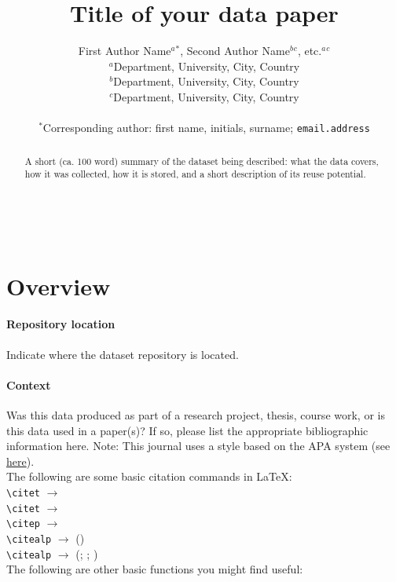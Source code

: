 \documentclass{article}
\title{Title of your data paper}
\author{First Author Name$^{a}$$^{*}$, Second Author Name$^{b}$$^{c}$, etc.$^{a}$$^{c}$ \\
        \small $^{a}$Department, University, City, Country \\
        \small $^{b}$Department, University, City, Country \\
        \small $^{c}$Department, University, City, Country \\\\
        \small $^{*}$Corresponding author: first name, initials, surname; \tt{email.address} \\
}
\date{}
\begin{document}
\maketitle
\begin{abstract} 
\noindent A short (ca. 100 word) summary of the dataset being described: what the data covers, how it was collected, how it is stored, and a short description of its reuse potential. \end{abstract}

\noindent{}\\

\noindent{} 

\section{Overview}
\paragraph{Repository location} Indicate where the dataset repository is located.
\paragraph{Context} Was this data produced as part of a research project, thesis, course work, or is this data used in a paper(s)? If so, please list the appropriate bibliographic information here. Note: This journal uses a style based on the APA system (see \href{https://openhumanitiesdata.metajnl.com/about/submissions/#References}{here}).\\

\noindent The following are some basic citation commands in \LaTeX: \\

\noindent
\verb|\citet| $\rightarrow$ \citet{jenset&mcgil}\\
\verb|\citet| $\rightarrow$ \citet{shree-a}\\
\verb|\citep| $\rightarrow$ \citep{fabricius-hansen2012b}\\
\verb|\citealp| $\rightarrow$ (\citealp{eckhoff2018a})\\
\verb|\citealp| $\rightarrow$ (\citealp{eckhoff2018a}; \citealp{fabricius-hansen2012b}; \citealp{shree-a})\\

\noindent The following are other basic functions you might find useful:\\
\end{document}
